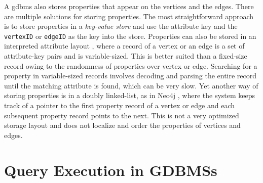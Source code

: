 A \gls{gdbms} also stores properties that appear on the vertices and the edges. There are multiple solutions for storing properties. The most straightforward approach is to store properties in a \emph{key-value store} \cite{dgraph} and use the attribute key and the \texttt{vertexID} or \texttt{edgeID} as the key into the store. Properties can also be stored in an interpreted attribute layout \cite{beckmann:sparse}, where a record of a vertex or an edge is a set of attribute-key pairs and is variable-sized. This is better suited than a fixed-size record owing to the randomness of properties over vertex or edge. Searching for a property in variable-sized records involves decoding and parsing the entire record until the matching attribute is found, which can be very slow. Yet another way of storing properties is in a doubly linked-list, as in Neo4j \cite{neo4j}, where the system keeps track of a pointer to the first property record of a vertex or edge and each subsequent property record points to the next. This is not a very optimized storage layout and does not localize and order the properties of vertices and edges. 

\section{Query Execution in GDBMSs}
\label{sec:operators}

